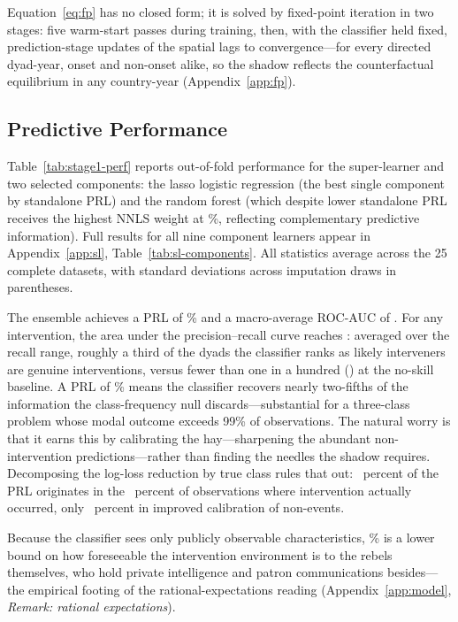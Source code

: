 Equation~\eqref{eq:fp} has no closed form; it is solved by fixed-point
iteration in two stages: five warm-start passes during training, then, with
the classifier held fixed, prediction-stage updates of the spatial lags to
convergence---for every directed dyad-year, onset and non-onset alike, so
the shadow reflects the counterfactual equilibrium in any country-year
(Appendix~\ref{app:fp}).

\subsection{Predictive Performance}

Table~\ref{tab:stage1-perf} reports out-of-fold performance for the super-learner
and two selected components: the lasso logistic regression (the best single
component by standalone PRL) and the random forest (which despite lower standalone
PRL receives the highest NNLS weight at \WtRF\%, reflecting complementary
predictive information).  Full results for all nine component learners appear in
Appendix~\ref{app:sl}, Table~\ref{tab:sl-components}.  All statistics average
across the 25 complete datasets, with standard deviations across imputation draws
in parentheses.



The ensemble achieves a PRL of \SLprl\% and a macro-average ROC-AUC of
\SLrocauc.  For any intervention, the area under the precision--recall curve
reaches \SLaucprAny{}: averaged over the recall range, roughly a third of the
dyads the classifier ranks as likely interveners are genuine interventions,
versus fewer than one in a hundred (\AucprBase{}) at the no-skill baseline.
A PRL of \SLprl\% means the classifier recovers nearly two-fifths of the
information the class-frequency null discards---substantial for a
three-class problem whose modal outcome exceeds 99\% of observations.  The
natural worry is that it earns this by calibrating the hay---sharpening the
abundant non-intervention predictions---rather than finding the needles the
shadow requires.  Decomposing the log-loss reduction by true class rules
that out: \PRLfromEvents\ percent of the PRL originates in the
\DyadIntPct\ percent of observations where intervention actually occurred,
only \PRLfromCalib\ percent in improved calibration of non-events.

Because the classifier sees only publicly observable characteristics,
\SLprl\% is a lower bound on how foreseeable the intervention environment is
to the rebels themselves, who hold private intelligence and patron
communications besides---the empirical footing of the rational-expectations
reading (Appendix~\ref{app:model}, \emph{Remark: rational
expectations}).


